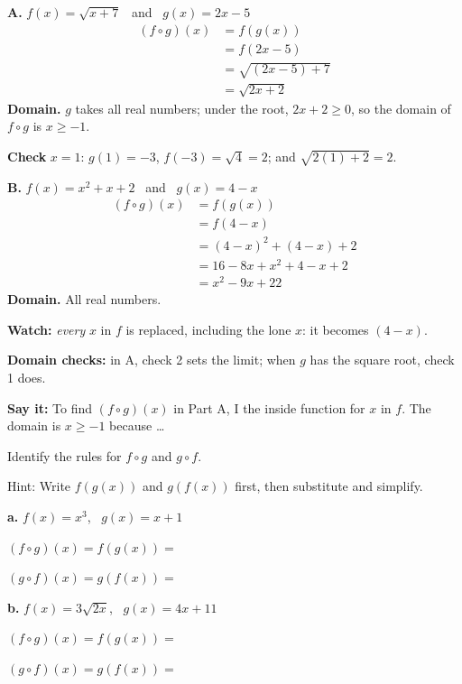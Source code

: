 \begin{minipage}[t]{0.47\textwidth}
\textbf{A.} $f(x)=\sqrt{x+7}$ \ and \ $g(x)=2x-5$
\begin{align*}
(f\circ g)(x)&=f(g(x))\\
&=f(2x-5)\\
&=\sqrt{(2x-5)+7}\\
&=\sqrt{2x+2}
\end{align*}
\textbf{Domain.} $g$ takes all real numbers; under the root, $2x+2\geq0$, so the domain of $f\circ g$ is $x\geq-1$.

\textbf{Check} $x=1$: $g(1)=-3$, $f(-3)=\sqrt{4}=2$; and $\sqrt{2(1)+2}=2$. \checkmark
\end{minipage}\hfill
\begin{minipage}[t]{0.49\textwidth}
\textbf{B.} $f(x)=x^2+x+2$ \ and \ $g(x)=4-x$
\begin{align*}
(f\circ g)(x)&=f(g(x))\\
&=f(4-x)\\
&=(4-x)^2+(4-x)+2\\
&=16-8x+x^2+4-x+2\\
&=x^2-9x+22
\end{align*}
\textbf{Domain.} All real numbers.

\textbf{Watch:} \emph{every} $x$ in $f$ is replaced, including the lone $x$: it becomes $(4-x)$.

\textbf{Domain checks:} in A, check 2 sets the limit; when $g$ has the square root, check 1 does.
\end{minipage}

\vspace{4pt}
\textbf{Say it:} To find $(f\circ g)(x)$ in Part A, I \blank[2.4cm] the inside function \blank[2cm] for $x$ in $f$. The domain is $x\geq-1$ because \dots\lines[1]

\newpage

Identify the rules for $f\circ g$ and $g\circ f$.

Hint: Write $f(g(x))$ and $g(f(x))$ first, then substitute and simplify.

\begin{minipage}[t]{0.48\textwidth}
\textbf{a.} $f(x)=x^3$, \ $g(x)=x+1$

\vspace{4pt}
$(f\circ g)(x)=f(g(x))=$\lines[6]

\vspace{6pt}
$(g\circ f)(x)=g(f(x))=$\lines[5]
\end{minipage}\hfill
\begin{minipage}[t]{0.48\textwidth}
\textbf{b.} $f(x)=3\sqrt{2x}$, \ $g(x)=4x+11$

\vspace{4pt}
$(f\circ g)(x)=f(g(x))=$\lines[6]

\vspace{6pt}
$(g\circ f)(x)=g(f(x))=$\lines[5]
\end{minipage}

